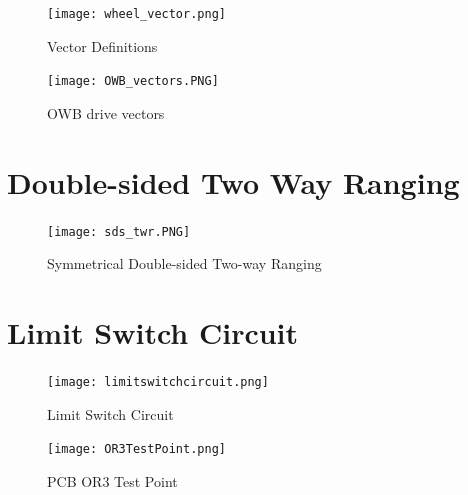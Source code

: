 \documentclass{report}
\begin{document}
    \begin{figure}[ht!]
      \centering
      \begin{minipage}[b]{0.45\linewidth}
        \centering
        \texttt{[image: wheel\_vector.png]}
        \caption{Vector Definitions}
        \label{fig:vecdef}
      \end{minipage}
      \hfill
      \begin{minipage}[b]{0.45\linewidth}
        \centering
        \texttt{[image: OWB\_vectors.PNG]}
        \caption{OWB drive vectors \cite{wada2015OWB}}
        \label{fig:owb_vec}
      \end{minipage}

      \label{fig:vecs}
    \end{figure}

    \newpage

    \section{Double-sided Two Way Ranging}

    \begin{figure}[ht!]
      \begin{center}
          \texttt{[image: sds\_twr.PNG]}\\
          \caption{ Symmetrical Double-sided Two-way Ranging } 
          \label{fig:sds_twr}
      \end{center}
    \end{figure}

    \newpage

    \section{Limit Switch Circuit}

    \begin{figure}[ht!]
      \begin{center}
          \texttt{[image: limitswitchcircuit.png]}\\
          \caption{ Limit Switch Circuit } 
          \label{fig:limitswitchcircuit}
      \end{center}
    \end{figure}

    \begin{figure}[ht!]
      \begin{center}
          \texttt{[image: OR3TestPoint.png]}\\
          \caption{ PCB OR3 Test Point } 
          \label{fig:OR3TestPoint}
      \end{center}  
    \end{figure}
\end{document}
